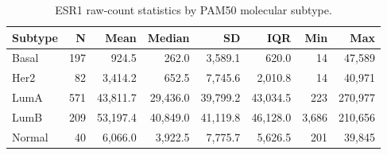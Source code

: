 \begin{table}[H]

\caption{\label{tab:export-latex-tables}ESR1 raw-count statistics by PAM50 molecular subtype.}
\centering
\begin{tabular}[t]{lrrrrrrr}
\toprule
Subtype & N & Mean & Median & SD & IQR & Min & Max\\
\midrule
Basal & 197 & 924.5 & 262.0 & 3,589.1 & 620.0 & 14 & 47,589\\
Her2 & 82 & 3,414.2 & 652.5 & 7,745.6 & 2,010.8 & 14 & 40,971\\
LumA & 571 & 43,811.7 & 29,436.0 & 39,799.2 & 43,034.5 & 223 & 270,977\\
LumB & 209 & 53,197.4 & 40,849.0 & 41,119.8 & 46,128.0 & 3,686 & 210,656\\
Normal & 40 & 6,066.0 & 3,922.5 & 7,775.7 & 5,626.5 & 201 & 39,845\\
\bottomrule
\end{tabular}
\end{table}
